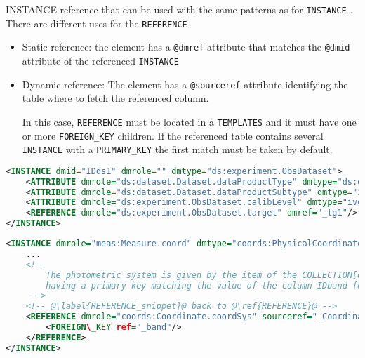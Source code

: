 INSTANCE reference that can be used with the same patterns as for \texttt{INSTANCE} .
There are different uses for the \texttt{REFERENCE} 

\begin{itemize}
    \item Static reference: the element has a \texttt{@dmref} attribute that matches the \texttt{@dmid} attribute of the referenced \texttt{INSTANCE} 
    \item Dynamic reference: The element has a \texttt{@sourceref} attribute identifying  the table where to fetch the referenced column. 
    
             In this case, \texttt{REFERENCE} must be located in a \texttt{TEMPLATES} and it must have one or more \texttt{FOREIGN\_KEY} children. 
             If the referenced table contains several \texttt{INSTANCE} with a \texttt{PRIMARY\_KEY}  the first match must be taken by default.
\end{itemize}

\begin{lstlisting}[caption={Simple \texttt{REFERENCE}, to be replaced with the \texttt{INSTANCE} having \texttt{@dmid} \_tg1 (see \ref{REFERENCE_snippet_1}).},language=XML]
<INSTANCE dmid="IDds1" dmrole="" dmtype="ds:experiment.ObsDataset">
    <ATTRIBUTE dmrole="ds:dataset.Dataset.dataProductType" dmtype="ds:dataset.DataProductType" value="TIMESERIES"/>
    <ATTRIBUTE dmrole="ds:dataset.Dataset.dataProductSubtype" dmtype="ivoa:string" value="GAIA Time Series"/>
    <ATTRIBUTE dmrole="ds:experiment.ObsDataset.calibLevel" dmtype="ivoa:integer" value="1"/>
    <REFERENCE dmrole="ds:experiment.ObsDataset.target" dmref="_tg1"/>
</INSTANCE>

\end{lstlisting}

\begin{lstlisting}[caption={Dynamic \texttt{REFERENCE}, to be replaced with the \texttt{INSTANCE} of the table of collection \_CoordinateSystems and having a \texttt{PRIMARY\_KEY} matching the value of the column  \texttt{\_band}. This pattern is valid in the context of a TEMPLATES (see \ref{REFERENCE_snippet_2}).},language=XML]
<INSTANCE dmrole="meas:Measure.coord" dmtype="coords:PhysicalCoordinate">
    ...
    <!--
        The photometric system is given by the item of the COLLECTION[dmid=IDCoordinateSystems]
        having a primary key matching the value of the column IDband for that particular row
     -->
    <!-- @\label{REFERENCE_snippet}@ back to @\ref{REFERENCE}@ -->
    <REFERENCE dmrole="coords:Coordinate.coordSys" sourceref="_CoordinateSystems">
        <FOREIGN\_KEY ref="_band"/>
    </REFERENCE>
</INSTANCE>
\end{lstlisting}

